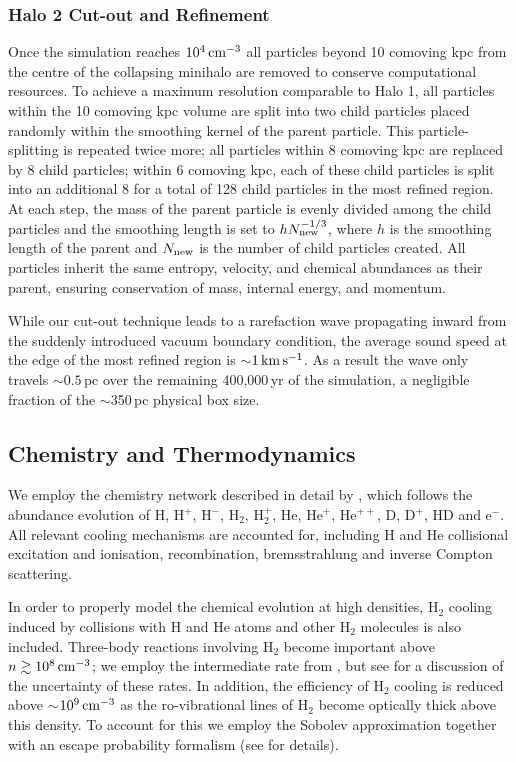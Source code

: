 \documentclass[usenatbib]{mn2e}
\newcommand{\cc}{\,{\rm cm}^{-3}}
\newcommand{\htwo}{\mathrm{H}_2}
\newcommand{\hd}{\mathrm{HD}}
\newcommand{\deut}{\mathrm{D}}
\newcommand{\h}{\mathrm{H}}
\newcommand{\hplus}{\mathrm{H}^+}
\newcommand{\hminus}{\mathrm{H}^-}
\newcommand{\he}{\mathrm{He}}
\newcommand{\heplus}{\mathrm{He}^+}
\begin{document}
\subsubsection{Halo 2 Cut-out and Refinement}
\label{cutout}

Once the simulation reaches $10^4\cc$ all particles beyond 10 comoving kpc from the centre of the collapsing minihalo are removed to conserve computational resources. 
To achieve a maximum resolution comparable to Halo 1, all particles within the 10 comoving kpc volume are split into two child particles placed randomly within the smoothing kernel of the parent particle.  
This particle-splitting is repeated twice more; all particles within 8 comoving kpc are replaced by 8 child particles; within 6 comoving kpc, each of these child particles is split into an additional 8 for a total of 128 child particles in the most refined region.  
At each step, the mass of the parent particle is evenly divided among the child particles and the smoothing length is set to $h N_{\rm new}^{-1/3}$, where $h$ is the smoothing length of the parent and $N_{\rm new}$ is the number of child particles created.  
All particles inherit the same entropy, velocity, and chemical abundances as their parent, ensuring conservation of mass, internal energy, and momentum.

While our cut-out technique leads to a rarefaction wave propagating inward from the suddenly introduced vacuum boundary condition, the average sound speed at the edge of the most refined region is $\sim$$1\,{\rm km}\,{\rm s}^{-1}$.  
As a result the wave only travels $\sim$$0.5\,$pc over the remaining 400,000$\,$yr of the simulation, a negligible fraction of the $\sim$350$\,$pc physical box size.

\subsection{Chemistry and Thermodynamics}
\label{chemistry}
 We employ the chemistry network described in detail by \citet{Greifetal2009b}, which follows the abundance evolution of $\h$, $\hplus$, $\hminus$, $\htwo$, $\htwo^+$, $\he$, $\heplus$, $\he^{++}$, $\deut$, $\deut^+$, $\hd$ and e$^-$. 
 All relevant cooling mechanisms are accounted for, including $\h$ and $\he$ collisional excitation and ionisation, recombination, bremsstrahlung and inverse Compton scattering. 
 
 In order to properly model the chemical evolution at high densities, $\htwo$ cooling induced by collisions with $\h$ and $\he$ atoms and other $\htwo$ molecules is also included.  
 Three-body reactions involving $\htwo$ become important above $n \gtrsim 10^8\cc$; we employ the intermediate rate from \citet{PallaSalpeterStahler1983}, but see \citet{Turketal2011} for a discussion of the uncertainty of these rates. 
 In addition, the efficiency of $\htwo$ cooling is reduced above $\sim$$10^9\cc$ as the ro-vibrational lines of $\htwo$ become optically thick above this density.  
 To account for this we employ the Sobolev approximation together with an escape probability formalism (see \citealt{Yoshidaetal2006, Greifetal2011} for details). 
\end{document}
